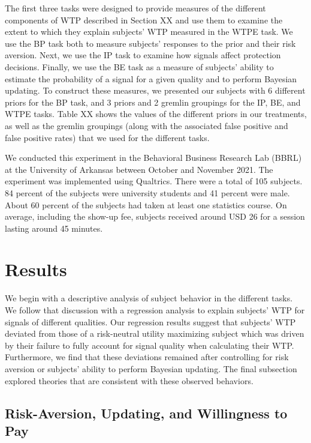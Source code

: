 \documentclass[12pt,a4paper]{article}
\begin{document}
The first three tasks were designed to provide measures of the different components of WTP described in Section XX and use them to examine the extent to which they explain subjects’ WTP measured in the WTPE task. We use the BP task both to measure subjects’ responses to the prior and their risk aversion. Next, we use the IP task to examine how signals affect protection decisions. Finally, we use the BE task as a measure of subjects’ ability to estimate the probability of a signal for a given quality and to perform Bayesian updating. To construct these measures, we presented our subjects with 6 different priors for the BP task, and 3 priors and 2 gremlin groupings for the IP, BE, and WTPE tasks. Table XX shows the values of the different priors in our treatments, as well as the gremlin groupings (along with the associated false positive and false positive rates) that we used for the different tasks.

We conducted this experiment in the Behavioral Business Research Lab (BBRL) at the University of Arkansas between October and November 2021.  The experiment was implemented using Qualtrics. There were a total of 105 subjects. 84 percent of the subjects were university students and 41 percent were male.  About 60 percent of the subjects had taken at least one statistics course. On average, including the show-up fee, subjects received around USD 26 for a session lasting around 45 minutes.  

\vspace{20pt}
\section{Results}\label{sec:results}
We begin with a descriptive analysis of subject behavior in the different tasks. We follow that discussion with a regression analysis to explain subjects’ WTP for signals of different qualities. Our regression results suggest that subjects’ WTP deviated from those of a risk-neutral utility maximizing subject which was driven by their failure to fully account for signal quality when calculating their WTP. Furthermore, we find that these deviations remained after controlling for risk aversion or subjects’ ability to perform Bayesian updating. The final subsection explored theories that are consistent with these observed behaviors.

\subsection{Risk-Aversion, Updating, and Willingness to Pay}
\end{document}

